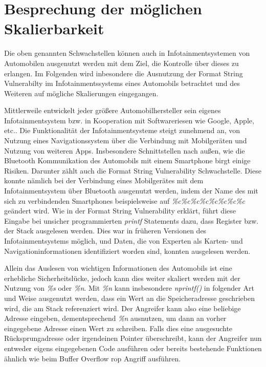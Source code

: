 \documentclass[a4paper,
DIV=13,
12pt,
BCOR=10mm,
department=FakIM,
oneside,
parskip=half,
automark,
listof=totocnumbered,
bibliography=totocnumbered,
acronym=totocnumbered
] {OTHRartcl}
\begin{document}
\newpage
\section{Besprechung der möglichen Skalierbarkeit}
Die oben genannten Schwachstellen können auch in Infotainmentsystemen von Automobilen ausgenutzt werden mit dem Ziel, die Kontrolle über dieses zu erlangen.
Im Folgenden wird inbesondere die Ausnutzung der Format String Vulnerabilty im Infotainmentssystems eines Automobils betrachtet und des Weiteren auf mögliche Skalierungen eingegangen.

Mittlerweile entwickelt jeder größere Automobilhersteller sein eigenes Infotainmentsystem bzw. in Kooperation mit Softwareriesen wie Google, Apple, etc..
Die Funktionalität der Infotainmentsysteme steigt zunehmend an, von Nutzung eines Navigationssystem über die Verbindung mit Mobilgeräten und Nutzung von weiteren Apps.
Insbesondere Schnittstellen nach außen, wie die Bluetooth Kommunikation des Automobils mit einem Smartphone birgt einige Risiken.
Darunter zählt auch die Format String Vulnerability Schwachstelle. Diese konnte nämlich bei der Verbindung eines Mobilgerätes mit dem Infotainmentsystem über Bluetooth
ausgenutzt werden, indem der Name des mit sich zu verbindenden Smartphones beispielsweise auf \textit{\%c\%c\%c\%c\%c\%c\%c\%c} geändert wird.
Wie in der Format String Vulnerability erklärt, führt diese Eingabe bei unsicher programmierten \textit{printf} Statements dazu, dass Register bzw. der Stack ausgelesen werden.
Dies war in früheren Versionen des Infotainmentsystems möglich, und Daten, die von Experten als Karten- und Navigationinformationen identifiziert worden sind, konnten ausgelesen werden.

Allein das Auslesen von wichtigen Informationen des Automobils ist eine erhebliche Sicherheitslücke, jedoch kann dies weiter skaliert werden mit der Nutzung von \textit{\%s} oder \textit{\%n}.
Mit \textit{\%n} kann insbesondere \textit{nprintf()} in folgender Art und Weise ausgenutzt werden, dass ein Wert an die Speicheradresse geschrieben wird, die am Stack referenziert wird.
Der Angreifer kann also eine beliebige Adresse eingeben, dementsprechend \textit{\%n} ausnutzen, um dann an vorher eingegebene Adresse einen Wert zu schreiben.
Falls dies eine ausgesuchte Rücksprungadresse oder irgendeinen Pointer überschreibt, kann der Angreifer nun entweder eigens eingegebenen Code ausführen oder bereits bestehende Funktionen
ähnlich wie beim Buffer Overflow \ac{rop} Angriff ausführen.
\end{document}

